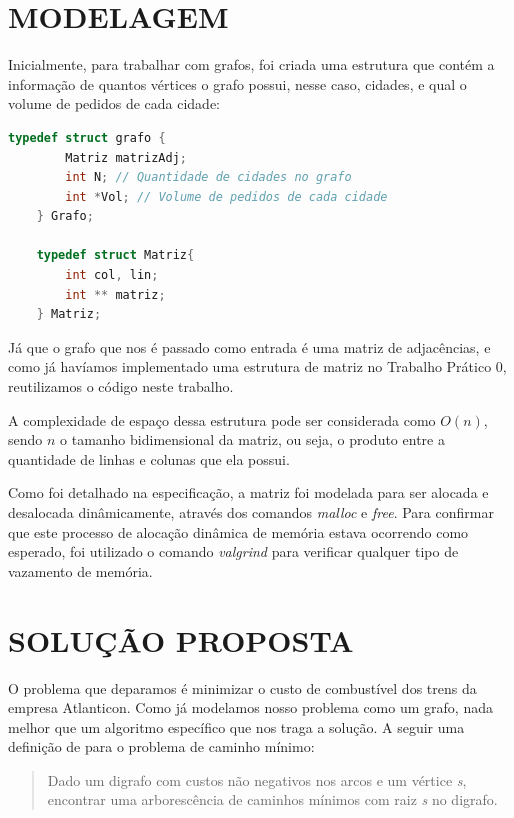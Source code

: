 \documentclass[12pt]{article}
\begin{document}
\section{MODELAGEM}
\label{modelagem}

	Inicialmente, para trabalhar com grafos, foi criada uma estrutura que contém a informação de quantos vértices o grafo possui, nesse caso, cidades, e qual o volume de pedidos de cada cidade:

    \begin{lstlisting}[language=c]
    typedef struct grafo {
        Matriz matrizAdj;
        int N; // Quantidade de cidades no grafo
        int *Vol; // Volume de pedidos de cada cidade
    } Grafo;

    typedef struct Matriz{
        int col, lin;
        int ** matriz;
    } Matriz;

    \end{lstlisting}

    Já que o grafo que nos é passado como entrada é uma matriz de adjacências, e como já havíamos implementado uma estrutura de matriz no Trabalho Prático 0, reutilizamos o código neste trabalho.

	A complexidade de espaço dessa estrutura pode ser considerada como $O(n)$, sendo $n$ o tamanho bidimensional da matriz, ou seja, o produto entre a quantidade de linhas e colunas que ela possui.

	Como foi detalhado na especificação, a matriz foi modelada para ser alocada e desalocada dinâmicamente, através dos comandos \textit{malloc} e \textit{free}. Para confirmar que este processo de alocação dinâmica de memória estava ocorrendo como esperado, foi utilizado o comando \textit{valgrind} para verificar qualquer tipo de vazamento de memória.

\section{SOLUÇÃO PROPOSTA}
\label{solucao_proposta}

	O problema que deparamos é minimizar o custo de combustível dos trens da empresa Atlanticon. Como já modelamos nosso problema como um grafo, nada melhor que um algoritmo específico que nos traga a solução. A seguir uma definição de \cite{sedgewick} para o problema de caminho mínimo:

	\begin{quote}
	Dado um digrafo com custos não negativos nos arcos e um vértice \textit{s}, encontrar uma arborescência de caminhos mínimos com raiz \textit{s} no digrafo.
	\end{quote}
\end{document}

